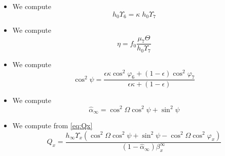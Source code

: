 \documentclass[aps,onecolumn,10pt]{revtex4}
\begin{document}
\begin{itemize}
\item We compute
\begin{equation}
	h_0 \Upsilon_6 = \kappa \; h_0 \Upsilon_7
\end{equation}

\item We compute
$$
	\eta = f_0 \dfrac{\mu_7 \Theta}{h_0\Upsilon_7}
$$

\item We compute
$$
	\cos^2\psi = \dfrac{\epsilon\kappa\cos^2\varphi_6+(1-\epsilon)\cos^2\varphi_7}{\epsilon\kappa+(1-\epsilon)} 
$$

\item We compute
$$
	\hat\alpha_\infty = \cos^2\Omega\cos^2\psi + \sin^2\psi
$$

\item We compute from \eqref{eq:Qx}
$$
	Q_x =  \dfrac{h_\infty \Upsilon_x \left( {\cos^2\Omega \cos^2\psi + \sin^2\psi}  -  {\cos^2\Omega \cos^2 \varphi_x} \right)}{(1-\hat\alpha_\infty)\beta_x^\infty}
$$

\end{itemize}
\end{document}
